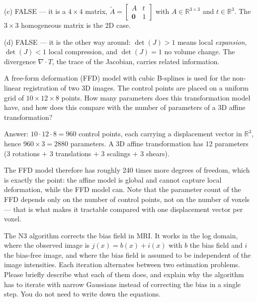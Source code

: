 \documentclass[11pt]{exam}
\newcommand{\answerspace}[1]{\ifprintanswers\else\vspace{#1}\fi}
\begin{document}
\begin{questions}
\begin{solution}
  (c) FALSE --- it is a $4 \times 4$ matrix,
  $\tilde A = \left[\begin{smallmatrix} A & t \\ \mathbf{0} & 1 \end{smallmatrix}\right]$ with
  $A \in \mathbb{R}^{3\times3}$ and $t \in \mathbb{R}^3$. The $3 \times 3$ homogeneous matrix is
  the 2D case.

  (d) FALSE --- it is the other way around: $\det(J) > 1$ means local \emph{expansion},
  $\det(J) < 1$ local compression, and $\det(J) = 1$ no volume change. The divergence
  $\nabla \cdot T$, the trace of the Jacobian, carries related information.
\end{solution}

\question
A free-form deformation (FFD) model with cubic B-splines is used for the non-linear registration
of two 3D images. The control points are placed on a uniform grid of $10 \times 12 \times 8$
points. How many parameters does this transformation model have, and how does this compare with
the number of parameters of a 3D affine transformation?

\begin{solution}
  Answer: $10 \cdot 12 \cdot 8 = 960$ control points, each carrying a displacement vector in
  $\mathbb{R}^3$, hence $960 \times 3 = 2880$ parameters. A 3D affine transformation has 12
  parameters (3 rotations $+$ 3 translations $+$ 3 scalings $+$ 3 shears).

  The FFD model therefore has roughly 240 times more degrees of freedom, which is exactly the
  point: the affine model is global and cannot capture local deformation, while the FFD model can.
  Note that the parameter count of the FFD depends only on the number of control points, not on
  the number of voxels --- that is what makes it tractable compared with one displacement vector
  per voxel.
\end{solution}
\answerspace{3.2cm}

\question
The N3 algorithm corrects the bias field in MRI. It works in the log domain, where the observed
image is $j(x) = b(x) + i(x)$ with $b$ the bias field and $i$ the bias-free image, and where the
bias field is assumed to be independent of the image intensities. Each iteration alternates
between two estimation problems. Please briefly describe what each of them does, and explain why
the algorithm has to iterate with narrow Gaussians instead of correcting the bias in a single
step. You do not need to write down the equations.


\end{questions}
\end{document}
